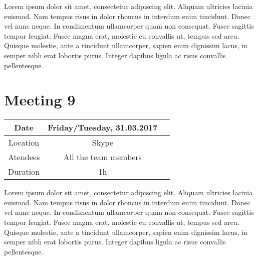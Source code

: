Lorem ipsum dolor sit amet, consectetur adipiscing elit. Aliquam ultricies lacinia euismod. Nam tempus risus in dolor rhoncus in interdum enim tincidunt. Donec vel nunc neque. In condimentum ullamcorper quam non consequat. Fusce sagittis tempor feugiat. Fusce magna erat, molestie eu convallis ut, tempus sed arcu. Quisque molestie, ante a tincidunt ullamcorper, sapien enim dignissim lacus, in semper nibh erat lobortis purus. Integer dapibus ligula ac risus convallis pellentesque.

\section{Meeting 9}
\begin{center}
	\begin{tabular}{| c | c | c }
		\hline
		Date & Friday/Tuesday, 	31.03.2017   \\
		\hline
		Location & Skype  \\  
		\hline
		Atendees & All the team members   \\
		\hline
		Duration & 1h  \\
		\hline
	\end{tabular}	
\end{center}


Lorem ipsum dolor sit amet, consectetur adipiscing elit. Aliquam ultricies lacinia euismod. Nam tempus risus in dolor rhoncus in interdum enim tincidunt. Donec vel nunc neque. In condimentum ullamcorper quam non consequat. Fusce sagittis tempor feugiat. Fusce magna erat, molestie eu convallis ut, tempus sed arcu. Quisque molestie, ante a tincidunt ullamcorper, sapien enim dignissim lacus, in semper nibh erat lobortis purus. Integer dapibus ligula ac risus convallis pellentesque.

